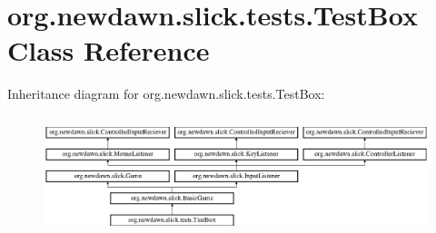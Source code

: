 \hypertarget{classorg_1_1newdawn_1_1slick_1_1tests_1_1_test_box}{}\section{org.\+newdawn.\+slick.\+tests.\+Test\+Box Class Reference}
\label{classorg_1_1newdawn_1_1slick_1_1tests_1_1_test_box}
Inheritance diagram for org.\+newdawn.\+slick.\+tests.\+Test\+Box\+:\begin{figure}[H]
\begin{center}
\leavevmode
\includegraphics[height=3.522012cm]{classorg_1_1newdawn_1_1slick_1_1tests_1_1_test_box}
\end{center}
\end{figure}
